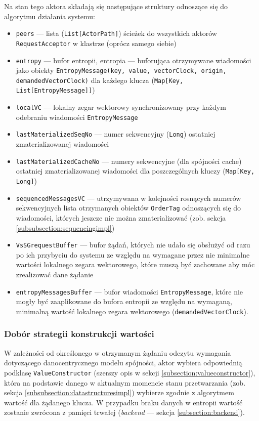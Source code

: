 Na stan tego aktora składają się następujące struktury odnoszące się do algorytmu działania systemu:
\begin{itemize}
    \item \texttt{peers} --- lista (\texttt{List[ActorPath]}) ścieżek do wszystkich aktorów \texttt{RequestAcceptor} w klastrze (oprócz samego siebie)
    \item \texttt{entropy} --- bufor entropii, entropia --- buforująca otrzymywane wiadomości jako obiekty \texttt{EntropyMessage(key, value, vectorClock, origin, demandedVectorClock)} dla każdego klucza (\texttt{Map[Key, List[EntropyMessage]]})
    \item \texttt{localVC} --- lokalny zegar wektorowy synchronizowany przy każdym odebraniu wiadomości \texttt{EntropyMessage}
    \item \texttt{lastMaterializedSeqNo} --- numer sekwencyjny (\texttt{Long}) ostatniej zmaterializowanej wiadomości
    \item \texttt{lastMaterializedCacheNo} --- numery sekwencyjne (dla spójności cache) ostatniej zmaterializowanej wiadomości dla poszczególnych kluczy (\texttt{Map[Key, Long]})
    \item \texttt{sequencedMessagesVC} --- utrzymywana w kolejności rosnących numerów sekwencyjnych lista otrzymanych obiektów \texttt{OrderTag} odnoszących się do wiadomości, których jeszcze nie można zmaterializować (zob. sekcja \ref{subsubsection:sequencingimpl})
    \item \texttt{VsSGrequestBuffer} --- bufor żądań, których nie udało się obsłużyć od razu po ich przybyciu do systemu ze względu na wymagane przez nie minimalne wartości lokalnego zegara wektorowego, które muszą być zachowane aby móc zrealizować dane żądanie
    \item \texttt{entropyMessagesBuffer} --- bufor wiadomości \texttt{EntropyMessage}, które nie mogły być zaaplikowane do bufora entropii ze względu na wymaganą, minimalną wartość lokalnego zegara wektorowego (\texttt{demandedVectorClock}).
\end{itemize}

\subsubsection{Dobór strategii konstrukcji wartości}

W zależności od określonego w otrzymanym żądaniu odczytu wymagania dotyczącego danocentrycznego modelu spójności, aktor wybiera odpowiednią podklasę \texttt{ValueConstructor} (szerszy opis w sekcji \ref{subsection:valueconstructor}), która na podstawie danego w aktualnym momencie stanu przetwarzania (zob. sekcja \ref{subsubsection:datastructuresimpl}) wybierze zgodnie z algorytmem wartość dla żądanego klucza. W przypadku braku danych w entropii wartość zostanie zwrócona z pamięci trwałej (\textit{backend} --- sekcja \ref{subsection:backend}).

